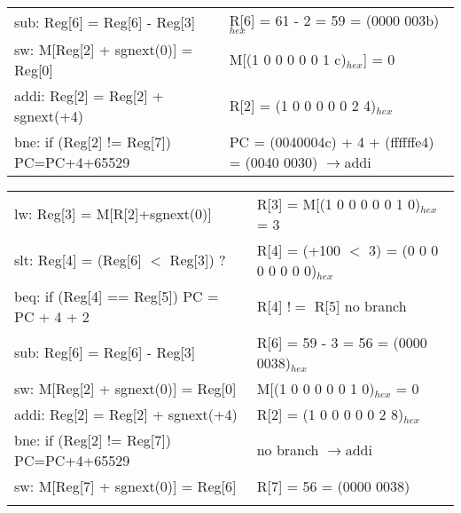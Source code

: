 \documentclass[11pt]{article}   	%
\begin{document}
\begin{table}[!htbp]
\begin{tabular}{ll}
sub: Reg[6] = Reg[6] - Reg[3]& R[6] = 61 - 2 = 59 = (0000 003b)$_{hex}$\\

sw: M[Reg[2] + sgnext(0)] = Reg[0]& M[(1 0 0 0 0 0 1 c)$_{hex}$] = 0\\

addi: Reg[2] = Reg[2] + sgnext(+4) & R[2] = (1 0 0 0 0 0 2 4)$_{hex}$\\

bne: if (Reg[2] != Reg[7]) PC=PC+4+65529 & PC = (0040004c) + 4 + (ffffffe4) = (0040 0030)  $\rightarrow$addi\\


\end{tabular}
\end{table}

\newpage

\begin{table}[!htbp]
\begin{tabular}{ll}

lw: Reg[3] = M[R[2]+sgnext(0)]&  R[3] = M[(1 0 0 0 0 0 1 0)$_{hex}$ = 3 \\

slt: Reg[4] = (Reg[6] $<$ Reg[3]) ?& R[4] = (+100 $<$ 3) = (0 0 0 0 0 0 0 0)$_{hex}$\\

beq: if (Reg[4] == Reg[5]) PC = PC + 4 + 2& R[4] $!=$ R[5]  no branch\\

sub: Reg[6] = Reg[6] - Reg[3]& R[6] = 59 - 3 = 56 = (0000 0038)$_{hex}$\\

sw: M[Reg[2] + sgnext(0)] = Reg[0]& M[(1 0 0 0 0 0 1 0)$_{hex}$ = 0\\

addi: Reg[2] = Reg[2] + sgnext(+4) & R[2] = (1 0 0 0 0 0 2 8)$_{hex}$\\

bne: if (Reg[2] != Reg[7]) PC=PC+4+65529 & no branch  $\rightarrow$addi\\

sw: M[Reg[7] + sgnext(0)] = Reg[6] & R[7] = 56 = (0000 0038)\\

&\\


\end{tabular}
\end{table}




\newpage
\end{document}
